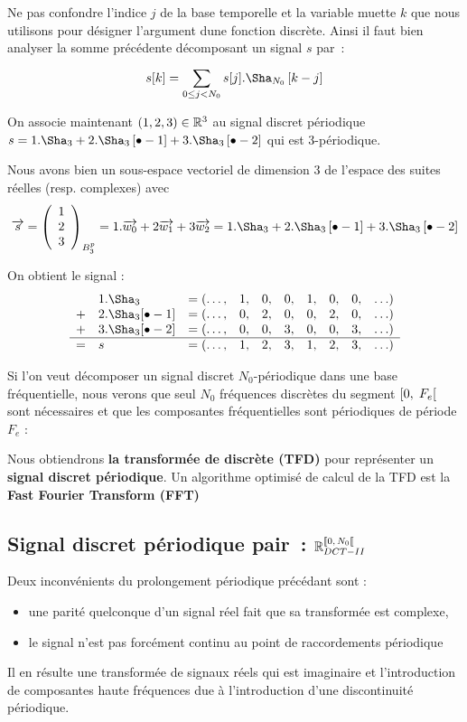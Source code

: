 Ne pas confondre l'indice
$j$ de la base temporelle et la variable muette
$k$ que nous utilisons pour désigner l'argument dune fonction
discrète. Ainsi il faut bien analyser la somme précédente décomposant
un signal $s$ par~:
\begin{equation}
  s[k] = \somme{0\leq j< N_0}{}{s[j].\Sha_{N_0}\b{k-j}}
\end{equation}

\begin{exemple}
  
  On associe maintenant $(1, 2, 3)\in\mathbb{R}^3$ au signal discret
  périodique
  $s=1.\Sha_{3}+2.\Sha_{3}\b{\bullet-1}+3.\Sha_{3}\b{\bullet-2}$ qui
  est 3-périodique.

  Nous avons bien un sous-espace vectoriel de
  dimension 3 de l'espace des suites réelles (resp. complexes) avec
  $$\vec{s} = \vvvectBase{1}{2}{3}{B_3^p} = 1.\vec{w_0}+2\vec{w_1}+3\vec{w_2} = 1.\Sha_{3}+2.\Sha_{3}\b{\bullet-1}+3.\Sha_{3}\b{\bullet-2}$$

  On obtient le signal :
  $$
  \begin{array}{llcccccccc}
     &1.\Sha_{3}            & =(\ldots, &1 , &0, &0, &1, &0, &0, &\ldots)\\
    +&2.\Sha_{3}[\bullet-1] & =(\ldots, &0 , &2, &0, &0, &2, &0, &\ldots)\\
    +&3.\Sha_{3}[\bullet-2] & =(\ldots, &0 , &0, &3, &0, &0, &3, &\ldots)\\\hline
    =& s  & =(\ldots, &1 , &2, &3, &1, &2, &3, &\ldots)
  \end{array}
  $$
\end{exemple}

\begin{remarque}
  Si l'on veut décomposer un signal discret $N_0$-périodique dans une
  base fréquentielle, nous verons que seul $N_0$ fréquences discrètes
  du segment $\left[0,\;F_e\right[$ sont nécessaires et que les composantes
  fréquentielles sont périodiques de période $F_e$ :


  Nous obtiendrons \textbf{la transformée de \Fourier{} discrète (TFD)}
  pour représenter un \textbf{signal discret périodique}. Un algorithme
  optimisé de calcul de la TFD est la \textbf{Fast Fourier Transform
    (FFT)}
\end{remarque}

\subsection{Signal discret périodique pair~: $\RNdctII$}
Deux inconvénients du  prolongement périodique précédant sont :
\begin{itemize}
  \item une parité quelconque d'un signal  réel fait que sa transformée est complexe,
  \item le signal n'est pas forcément continu au point de raccordements périodique
\end{itemize}
Il en résulte une transformée de signaux réels qui est imaginaire et l'introduction de composantes haute fréquences due à l'introduction d'une discontinuité périodique.

